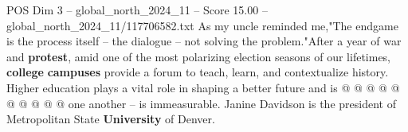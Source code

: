 \begin{textsample}{POS Dim 3 – global\_north\_2024\_11 – Score 15.00 – global\_north\_2024\_11/117706582.txt}
As my uncle reminded me,"The endgame is the process itself -- the dialogue -- not solving the problem."After a year of war and \textbf{protest}, amid one of the most polarizing election seasons of our lifetimes, \textbf{college} \textbf{campuses} provide a forum to teach, learn, and contextualize history.
Higher education plays a vital role in shaping a better future and is @ @ @ @ @ @ @ @ @ @ one another -- is immeasurable.
Janine Davidson is the president of Metropolitan State \textbf{University} of Denver.

\end{textsample}
